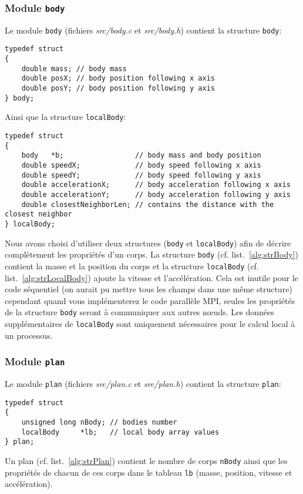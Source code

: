 \subsubsection{Module \texttt{body}}
Le module \texttt{body} (fichiers \textit{src/body.c} et \textit{src/body.h}) contient la structure \texttt{body}:
\begin{lstlisting}[caption={Structure \texttt{body}},label={alg:strBody}]
typedef struct 
{
	double mass; // body mass
	double posX; // body position following x axis
	double posY; // body position following y axis
} body;
\end{lstlisting}
Ainsi que la structure \texttt{localBody}:
\begin{lstlisting}[caption={Structure \texttt{localBody}},label={alg:strLocalBody}]
typedef struct 
{
	body   *b;                 // body mass and body position
	double speedX;             // body speed following x axis
	double speedY;             // body speed following y axis
	double accelerationX;      // body acceleration following x axis
	double accelerationY;      // body acceleration following y axis
	double closestNeighborLen; // contains the distance with the closest neighbor
} localBody;
\end{lstlisting}
Nous avons choisi d'utiliser deux structures (\texttt{body} et \texttt{localBody}) afin de décrire complètement les propriétés d'un corps.
La structure \texttt{body} (cf. list.~\ref{alg:strBody}) contient la masse et la position du corps et la structure \texttt{localBody} (cf. list.~\ref{alg:strLocalBody}) ajoute la vitesse et l'accélération.
Cela est inutile pour le code séquentiel (on aurait pu mettre tous les champs dans une même structure) cependant quand vous implémenterez le code parallèle MPI, seules les propriétés de la structure \texttt{body} seront à communiquer aux autres n\oe uds.
Les données supplémentaires de \texttt{localBody} sont uniquement nécessaires pour le calcul local à un processus.

\subsubsection{Module \texttt{plan}}
Le module \texttt{plan} (fichiers \textit{src/plan.c} et \textit{src/plan.h}) contient la structure \texttt{plan}:
\begin{lstlisting}[caption={Structure \texttt{plan}},label={alg:strPlan}]
typedef struct
{
	unsigned long nBody; // bodies number
	localBody     *lb;   // local body array values
} plan;
\end{lstlisting}
Un plan (cf. list.~\ref{alg:strPlan}) contient le nombre de corps \texttt{nBody} ainsi que les propriétés de chacun de ces corps dans le tableau \texttt{lb} (masse, position, vitesse et accélération).

